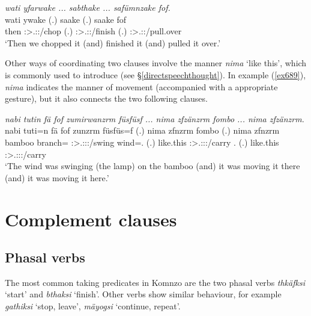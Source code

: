 \begin{exe}
	\ex \emph{wati yfarwake ... sabthake ... safümnzake fof.}\\
	\gll wati ywake (.) saake (.) saake fof\\
	then \Fpl:\Sbj>\Tsg.\Masc:\Pst:\Ipfv/chop (.) \Fpl:\Sbj>\Tsg.\Masc:\Pst:\Pfv/finish (.) \Fpl:\Sbj>\Tsg.\Masc:\Pst:\Pfv/pull.over \Emph{}\\
	\trans `Then we chopped it (and) finished it (and) pulled it over.'\\
	\label{ex669}
\end{exe}

Other ways of coordinating two clauses involve the manner  \emph{nima} `like this', which is commonly used to introduce  (see \S{}\ref{directspeechthought}). In example (\ref{ex689}), \emph{nima} indicates the manner of movement (accompanied with a appropriate gesture), but it also connects the two following clauses.

\begin{exe}
	\ex \emph{nabi tutin fä fof zumirwanzrm füsfüsf ... nima zfzänzrm fombo ... nima zfzänzrm.}\\
	\gll nabi tuti=n fä fof zunzrm füsfüs=f (.) nima zfnzrm fombo (.) nima zfnzrm\\
	bamboo branch=\Loc{} \Dist{} \Emph{} \Stsg:\Sbj>\Tsg.\F:\Obj:\Pst:\Dur/swing wind=\Erg.\Sg{} (.) {like.this} \Stsg:\Sbj>\Tsg.\F:\Obj:\Pst:\Dur/carry \Dist.\All{} (.) {like.this} \Stsg:\Sbj>\Tsg.\F:\Obj:\Pst:\Dur/carry\\
	\trans `The wind was swinging (the lamp) on the bamboo (and) it was moving it there (and) it was moving it here.'
	\label{ex689}
\end{exe}

\section{Complement clauses}\label{complementclauses}

\subsection{Phasal verbs}\label{phasalcomplements}

The most common  taking predicates in Komnzo are the two phasal verbs \emph{thkäfksi} `start' and \emph{bthaksi} `finish'. Other verbs show similar behaviour, for example \emph{gathiksi} `stop, leave', \emph{mäyogsi} `continue, repeat'.%

